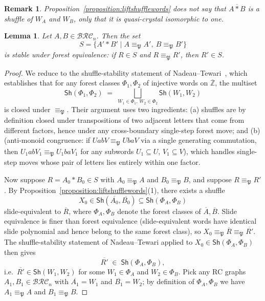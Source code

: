 \documentclass[pdflatex,sn-mathphys-num]{sn-jnl}
\numberwithin{equation}{subsection}
\newcommand{\BRC}{\mathcal{BRC}}
\newcommand{\forest}{\mathfrak{P}}
\theoremstyle{thmstyleone}
\newtheorem{lemma}{Lemma}[subsection]
\theoremstyle{thmstylethree}
\theoremstyle{thmstyletwo}
\newtheorem*{remark}{Remark}
\begin{document}
\begin{remark}
Proposition~\ref{proposition:liftshufflewords} does \emph{not} say that $\overline{A*B}$ \emph{is} a shuffle of $W_A$ and $W_B$, only that it is quasi-crystal isomorphic to one.
\end{remark}

\begin{lemma}\label{lemma:foreststable}
Let $A,B\in\BRC_n$. Then the set
$$S=\{A'*B'\mid A\equiv_\forest A',\ B\equiv_\forest B'\}$$
is stable under forest equivalence: if $R\in S$ and $R\equiv_\forest R'$, then $R'\in S$.
\end{lemma}
\begin{proof}
We reduce to the shuffle-stability statement of Nadeau--Tewari~\cite[proof of Theorem~6.3]{nadeau2024forest}, which establishes that for any forest classes $\Phi_1,\Phi_2$ of injective words on $\overline{\mathbb{Z}}$, the multiset
\[
\mathsf{Sh}(\Phi_1,\Phi_2)\;=\;\bigsqcup_{W_1\in\Phi_1,\,W_2\in\Phi_2}\mathsf{Sh}(W_1,W_2)
\]
is closed under $\equiv_\forest$. Their argument uses two ingredients: (a) shuffles are by definition closed under transpositions of two adjacent letters that come from different factors, hence under any cross-boundary single-step forest move; and (b) \cite[Lemma~5.10]{nadeau2024forest} (anti-monoid congruence: if $UabV\equiv_\forest UbaV$ via a single generating commutation, then $U_1abV_1\equiv_\forest U_1baV_1$ for any subwords $U_1\subseteq U$, $V_1\subseteq V$), which handles single-step moves whose pair of letters lies entirely within one factor.

Now suppose $R=A_0*B_0\in S$ with $A_0\equiv_\forest A$ and $B_0\equiv_\forest B$, and suppose $R\equiv_\forest R'$. By Proposition~\ref{proposition:liftshufflewords}(1), there exists a shuffle
\[
X_0\in\mathsf{Sh}(\overline{A_0},\overline{B_0})\subseteq\mathsf{Sh}(\Phi_A,\Phi_B)
\]
slide-equivalent to $\overline{R}$, where $\Phi_A,\Phi_B$ denote the forest classes of $\overline{A},\overline{B}$. Slide equivalence is finer than forest equivalence (slide-equivalent words have identical slide polynomial and hence belong to the same forest class), so $X_0\equiv_\forest\overline{R}\equiv_\forest\overline{R'}$. The shuffle-stability statement of Nadeau--Tewari applied to $X_0\in\mathsf{Sh}(\Phi_A,\Phi_B)$ then gives
\[
\overline{R'}\;\in\;\mathsf{Sh}(\Phi_A,\Phi_B),
\]
i.e.\ $\overline{R'}\in\mathsf{Sh}(W_1,W_2)$ for some $W_1\in\Phi_A$ and $W_2\in\Phi_B$. Pick any RC graphs $A_1,B_1\in\BRC_n$ with $\overline{A_1}=W_1$ and $\overline{B_1}=W_2$; by definition of $\Phi_A,\Phi_B$ we have $A_1\equiv_\forest A$ and $B_1\equiv_\forest B$.


\end{proof}
\end{document}
